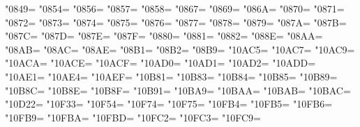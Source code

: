 \XeTeXcharclass"0849=\KclassArabR
\XeTeXcharclass"0854=\KclassArabR
\XeTeXcharclass"0856=\KclassArabR
\XeTeXcharclass"0857=\KclassArabR
\XeTeXcharclass"0858=\KclassArabR
\XeTeXcharclass"0867=\KclassArabR
\XeTeXcharclass"0869=\KclassArabR
\XeTeXcharclass"086A=\KclassArabR
\XeTeXcharclass"0870=\KclassArabR
\XeTeXcharclass"0871=\KclassArabR
\XeTeXcharclass"0872=\KclassArabR
\XeTeXcharclass"0873=\KclassArabR
\XeTeXcharclass"0874=\KclassArabR
\XeTeXcharclass"0875=\KclassArabR
\XeTeXcharclass"0876=\KclassArabR
\XeTeXcharclass"0877=\KclassArabR
\XeTeXcharclass"0878=\KclassArabR
\XeTeXcharclass"0879=\KclassArabR
\XeTeXcharclass"087A=\KclassArabR
\XeTeXcharclass"087B=\KclassArabR
\XeTeXcharclass"087C=\KclassArabR
\XeTeXcharclass"087D=\KclassArabR
\XeTeXcharclass"087E=\KclassArabR
\XeTeXcharclass"087F=\KclassArabR
\XeTeXcharclass"0880=\KclassArabR
\XeTeXcharclass"0881=\KclassArabR
\XeTeXcharclass"0882=\KclassArabR
\XeTeXcharclass"088E=\KclassArabR
\XeTeXcharclass"08AA=\KclassArabR
\XeTeXcharclass"08AB=\KclassArabR
\XeTeXcharclass"08AC=\KclassArabR
\XeTeXcharclass"08AE=\KclassArabR
\XeTeXcharclass"08B1=\KclassArabR
\XeTeXcharclass"08B2=\KclassArabR
\XeTeXcharclass"08B9=\KclassArabR
\XeTeXcharclass"10AC5=\KclassArabR
\XeTeXcharclass"10AC7=\KclassArabR
\XeTeXcharclass"10AC9=\KclassArabR
\XeTeXcharclass"10ACA=\KclassArabR
\XeTeXcharclass"10ACE=\KclassArabR
\XeTeXcharclass"10ACF=\KclassArabR
\XeTeXcharclass"10AD0=\KclassArabR
\XeTeXcharclass"10AD1=\KclassArabR
\XeTeXcharclass"10AD2=\KclassArabR
\XeTeXcharclass"10ADD=\KclassArabR
\XeTeXcharclass"10AE1=\KclassArabR
\XeTeXcharclass"10AE4=\KclassArabR
\XeTeXcharclass"10AEF=\KclassArabR
\XeTeXcharclass"10B81=\KclassArabR
\XeTeXcharclass"10B83=\KclassArabR
\XeTeXcharclass"10B84=\KclassArabR
\XeTeXcharclass"10B85=\KclassArabR
\XeTeXcharclass"10B89=\KclassArabR
\XeTeXcharclass"10B8C=\KclassArabR
\XeTeXcharclass"10B8E=\KclassArabR
\XeTeXcharclass"10B8F=\KclassArabR
\XeTeXcharclass"10B91=\KclassArabR
\XeTeXcharclass"10BA9=\KclassArabR
\XeTeXcharclass"10BAA=\KclassArabR
\XeTeXcharclass"10BAB=\KclassArabR
\XeTeXcharclass"10BAC=\KclassArabR
\XeTeXcharclass"10D22=\KclassArabR
\XeTeXcharclass"10F33=\KclassArabR
\XeTeXcharclass"10F54=\KclassArabR
\XeTeXcharclass"10F74=\KclassArabR
\XeTeXcharclass"10F75=\KclassArabR
\XeTeXcharclass"10FB4=\KclassArabR
\XeTeXcharclass"10FB5=\KclassArabR
\XeTeXcharclass"10FB6=\KclassArabR
\XeTeXcharclass"10FB9=\KclassArabR
\XeTeXcharclass"10FBA=\KclassArabR
\XeTeXcharclass"10FBD=\KclassArabR
\XeTeXcharclass"10FC2=\KclassArabR
\XeTeXcharclass"10FC3=\KclassArabR
\XeTeXcharclass"10FC9=\KclassArabR

